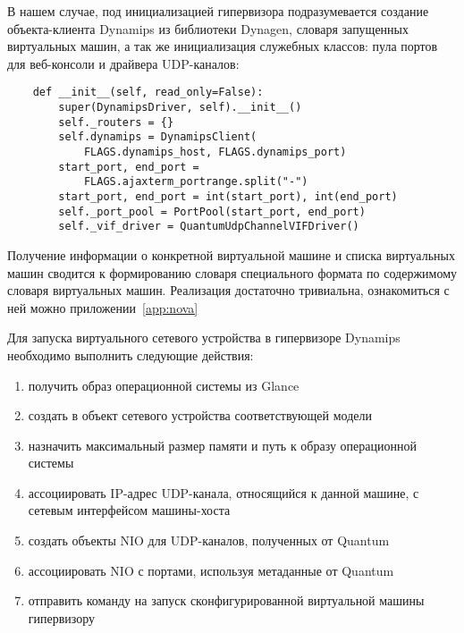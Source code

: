 В нашем случае, под инициализацией гипервизора подразумевается создание объекта-клиента
Dynamips из библиотеки Dynagen, словаря запущенных виртуальных машин, 
а так же инициализация служебных классов: пула портов для веб-консоли и драйвера UDP-каналов:
\begin{lstlisting}
    def __init__(self, read_only=False):
        super(DynamipsDriver, self).__init__()
        self._routers = {}
        self.dynamips = DynamipsClient(
            FLAGS.dynamips_host, FLAGS.dynamips_port)
        start_port, end_port = 
            FLAGS.ajaxterm_portrange.split("-")
        start_port, end_port = int(start_port), int(end_port)
        self._port_pool = PortPool(start_port, end_port)
        self._vif_driver = QuantumUdpChannelVIFDriver()
\end{lstlisting}

Получение информации о конкретной виртуальной машине и списка виртуальных машин сводится
к формированию словаря специального формата по содержимому словаря виртуальных машин. 
Реализация достаточно тривиальна, ознакомиться с ней можно приложении~\ref{app:nova}

Для запуска виртуального сетевого устройства в гипервизоре Dynamips необходимо выполнить 
следующие действия:
\begin{enumerate}
    \item получить образ операционной системы из Glance
    \item создать в объект сетевого устройства соответствующей модели
    \item назначить максимальный размер памяти и путь к образу операционной системы
    \item ассоциировать IP-адрес UDP-канала, относящийся к данной машине, с сетевым интерфейсом
             машины-хоста
    \item создать объекты NIO для UDP-каналов, полученных от Quantum
    \item ассоциировать NIO с портами, используя метаданные от Quantum
    \item отправить команду на запуск сконфигурированной виртуальной машины гипервизору
\end{enumerate}

